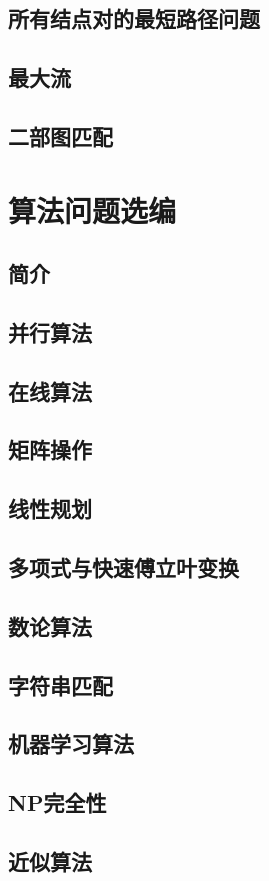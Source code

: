 \documentclass[lang=cn,newtx,10pt,scheme=chinese]{elegantbook}
\begin{document}
\chapter{所有结点对的最短路径问题}

\chapter{最大流}

\chapter{二部图匹配}

\part{算法问题选编}

\chapter*{简介}

\chapter{并行算法}

\chapter{在线算法}

\chapter{矩阵操作}

\chapter{线性规划}

\chapter{多项式与快速傅立叶变换}

\chapter{数论算法}

\chapter{字符串匹配}

\chapter{机器学习算法}

\chapter{NP完全性}

\chapter{近似算法}
\end{document}

